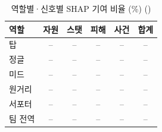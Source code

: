 \begin{table}[htbp]
  \centering
  \caption{역할별·신호별 SHAP 기여 비율 (\%) ()}
  \label{tab:shap}
  \small
  \begin{tabular}{@{}lccccc@{}}
    \toprule
    역할 & 자원 & 스탯 & 피해 & 사건 & 합계 \\
    \midrule
    탑 & -- & -- & -- & -- & -- \\
    정글 & -- & -- & -- & -- & -- \\
    미드 & -- & -- & -- & -- & -- \\
    원거리 & -- & -- & -- & -- & -- \\
    서포터 & -- & -- & -- & -- & -- \\
    팀 전역 & -- & -- & -- & -- & -- \\
    \bottomrule
  \end{tabular}
\end{table}
